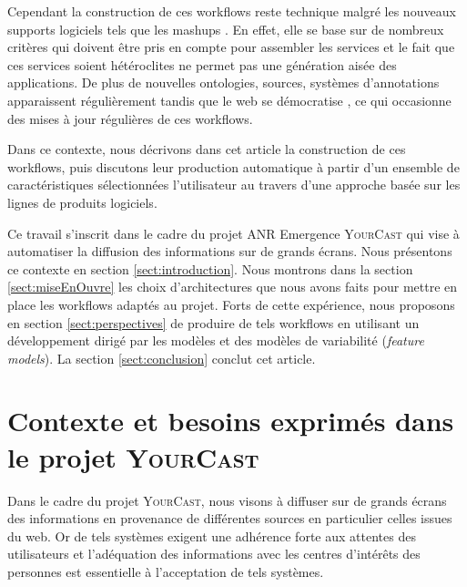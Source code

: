 \documentclass[]{easychair}
\newcommand{\comment}[4]{\par\noindent\hspace*{-0.5cm}{\parbox{\columnwidth}{\textbf{\color{#1}//#2[#3]:#4}}}\par}
\newcommand{\mi}[1]{\comment{blue}{}{#1}{MI}}
\newcommand{\ch}[1]{\comment{green}{}{#1}{CH}}
\newcommand{\Y}[0]{\textsc{YourCast}\xspace}
\begin{document}
Cependant la construction de ces workflows reste technique malgré les nouveaux supports logiciels tels que les mashups \cite{Floyd2007} \cite{Milanovic2004}. En effet, elle se base sur de nombreux critères qui doivent être pris en compte pour assembler les services et le fait que ces services soient hétéroclites ne permet pas une génération aisée des applications. 
De plus de nouvelles ontologies, sources, systèmes d'annotations apparaissent régulièrement tandis que le web se démocratise \cite{Anderruthy2007} \cite{Bross2010}, ce qui occasionne des mises à jour régulières de ces workflows.

Dans ce contexte, nous décrivons dans cet article la construction de ces workflows, puis discutons leur production automatique  à partir d'un ensemble de caractéristiques sélectionnées l'utilisateur au travers d'une approche basée sur les lignes de produits logiciels. 

Ce travail s'inscrit dans le cadre du projet ANR Emergence \Y qui vise à automatiser la diffusion des informations sur de grands écrans. Nous présentons ce contexte en section \ref{sect:introduction}.
Nous montrons dans la section \ref{sect:miseEnOuvre} les choix d'architectures  que nous avons faits pour mettre en place les workflows adaptés au projet. Forts de cette expérience, nous proposons en section \ref{sect:perspectives} de produire de tels workflows en utilisant un développement dirigé par les modèles et des modèles de variabilité (\textit{feature models})\cite{Report1990}.  La section \ref{sect:conclusion} conclut cet article. 



\section{Contexte et besoins exprimés dans le projet \Y}
\label{sect:exemple}
Dans le cadre du projet \Y, nous visons à diffuser sur de grands écrans des informations en provenance de différentes sources en particulier celles issues du web. Or de tels systèmes exigent une adhérence forte aux attentes des utilisateurs et l'adéquation des informations avec les centres d'intérêts des personnes est essentielle à l'acceptation de tels systèmes. 
\end{document}
